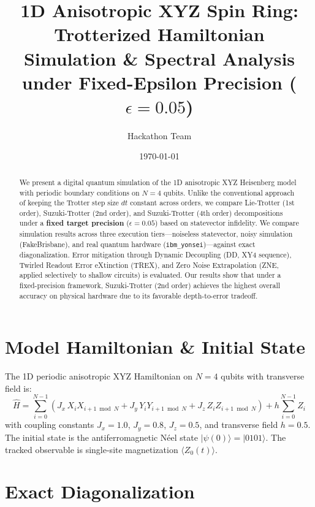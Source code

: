 \documentclass[11pt,a4paper]{article}
\title{1D Anisotropic XYZ Spin Ring:\\Trotterized Hamiltonian Simulation \& Spectral Analysis\\under Fixed-Epsilon Precision ($\epsilon=0.05$)}
\author{Hackathon Team}
\date{\today}
\begin{document}
\maketitle

\begin{abstract}
We present a digital quantum simulation of the 1D anisotropic XYZ Heisenberg model with periodic boundary conditions on $N=4$ qubits. 
Unlike the conventional approach of keeping the Trotter step size $dt$ constant across orders, we compare Lie-Trotter (1st order), Suzuki-Trotter (2nd order), and Suzuki-Trotter (4th order) decompositions under a \textbf{fixed target precision} ($\epsilon = 0.05$) based on statevector infidelity.
We compare simulation results across three execution tiers---noiseless statevector, noisy simulation (FakeBrisbane), and real quantum hardware (\texttt{ibm\_yonsei})---against exact diagonalization. 
Error mitigation through Dynamic Decoupling (DD, XY4 sequence), Twirled Readout Error eXtinction (TREX), and Zero Noise Extrapolation (ZNE, applied selectively to shallow circuits) is evaluated.
Our results show that under a fixed-precision framework, Suzuki-Trotter (2nd order) achieves the highest overall accuracy on physical hardware due to its favorable depth-to-error tradeoff.
\end{abstract}

\section{Model Hamiltonian \& Initial State}

The 1D periodic anisotropic XYZ Hamiltonian on $N=4$ qubits with transverse field is:
\begin{equation}
    \hat{H} = \sum_{i=0}^{N-1} \left( J_x\, X_i X_{i+1 \bmod N} + J_y\, Y_i Y_{i+1 \bmod N} + J_z\, Z_i Z_{i+1 \bmod N} \right) + h \sum_{i=0}^{N-1} Z_i
\end{equation}
with coupling constants $J_x = 1.0$, $J_y = 0.8$, $J_z = 0.5$, and transverse field $h = 0.5$.
The initial state is the antiferromagnetic N\'eel state $|\psi(0)\rangle = |0101\rangle$. The tracked observable is single-site magnetization $\langle Z_0(t) \rangle$.

\section{Exact Diagonalization}
\end{document}
